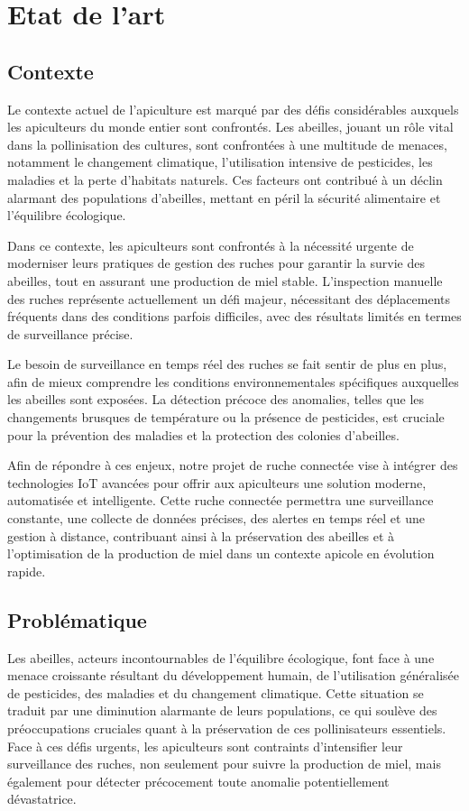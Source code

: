\documentclass[a4paper,12pt]{report}
\begin{document}
	\pagestyle{empty}
	\chapter{Etat de l'art}
	\section*{Contexte }
Le contexte actuel de l'apiculture est marqué par des défis considérables auxquels les apiculteurs du monde entier sont confrontés. Les abeilles, jouant un rôle vital dans la pollinisation des cultures, sont confrontées à une multitude de menaces, notamment le changement climatique, l'utilisation intensive de pesticides, les maladies et la perte d'habitats naturels. Ces facteurs ont contribué à un déclin alarmant des populations d'abeilles, mettant en péril la sécurité alimentaire et l'équilibre écologique.

Dans ce contexte, les apiculteurs sont confrontés à la nécessité urgente de moderniser leurs pratiques de gestion des ruches pour garantir la survie des abeilles, tout en assurant une production de miel stable. L'inspection manuelle des ruches représente actuellement un défi majeur, nécessitant des déplacements fréquents dans des conditions parfois difficiles, avec des résultats limités en termes de surveillance précise.

Le besoin de surveillance en temps réel des ruches se fait sentir de plus en plus, afin de mieux comprendre les conditions environnementales spécifiques auxquelles les abeilles sont exposées. La détection précoce des anomalies, telles que les changements brusques de température ou la présence de pesticides, est cruciale pour la prévention des maladies et la protection des colonies d'abeilles.

Afin de répondre à ces enjeux, notre projet de ruche connectée vise à intégrer des technologies IoT avancées pour offrir aux apiculteurs une solution moderne, automatisée et intelligente. Cette ruche connectée permettra une surveillance constante, une collecte de données précises, des alertes en temps réel et une gestion à distance, contribuant ainsi à la préservation des abeilles et à l'optimisation de la production de miel dans un contexte apicole en évolution rapide.
	\section*{Problématique}
Les abeilles, acteurs incontournables de l'équilibre écologique, font face à une menace croissante résultant du développement humain, de l'utilisation généralisée de pesticides, des maladies et du changement climatique. Cette situation se traduit par une diminution alarmante de leurs populations, ce qui soulève des préoccupations cruciales quant à la préservation de ces pollinisateurs essentiels. Face à ces défis urgents, les apiculteurs sont contraints d'intensifier leur surveillance des ruches, non seulement pour suivre la production de miel, mais également pour détecter précocement toute anomalie potentiellement dévastatrice.
\end{document}
